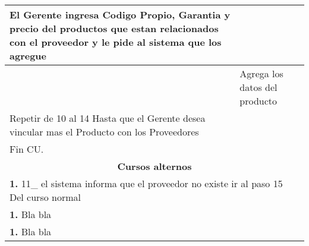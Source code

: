 \begin{longtable}{ |p{8cm}|p{8cm}| }
			\hline
			\inc El Gerente ingresa Codigo Propio, Garantia y precio del productos que estan relacionados con el proveedor y le pide al sistema que los agregue  &   \\
			\hline
			& \inc  Agrega los datos del producto   \\
			\hline
			\inc Repetir de 10 al 14 Hasta que el Gerente desea vincular mas el Producto con los Proveedores &  \\
			\hline
			\inc Fin CU. & \\
		\hline
		\multicolumn{2}{|c|}{\textbf{Cursos alternos}}\\
		\hline
		\multicolumn{2}{|p{16cm}|}{\textbf{1. }11_ el sistema informa que el proveedor no existe ir al paso 15 Del curso normal }\\
		\hline
		\multicolumn{2}{|p{16cm}|}{\textbf{1. }Bla bla }\\
		\hline
		\multicolumn{2}{|p{16cm}|}{\textbf{1. }Bla bla }\\
		\hline	
	\end{longtable}